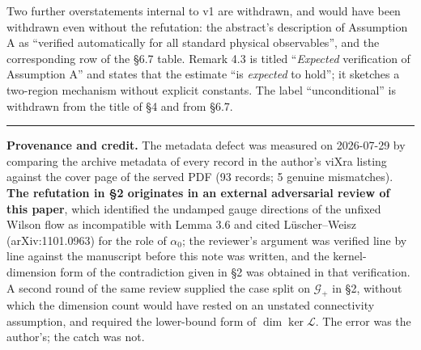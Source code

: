 \documentclass[11pt]{article}
\begin{document}
Two further overstatements internal to v1 are withdrawn, and would have been withdrawn
even without the refutation: the abstract's description of Assumption A as ``verified
automatically for all standard physical observables'', and the corresponding row of the
\S6.7 table. Remark 4.3 is titled ``\emph{Expected} verification of Assumption A'' and
states that the estimate ``is \emph{expected} to hold''; it sketches a two-region
mechanism without explicit constants. The label ``unconditional'' is withdrawn from the
title of \S4 and from \S6.7.

\vspace{4pt}
\noindent\rule{\textwidth}{0.8pt}

\noindent\footnotesize
\textbf{Provenance and credit.} The metadata defect was measured on 2026-07-29 by
comparing the archive metadata of every record in the author's viXra listing against
the cover page of the served PDF (93 records; 5 genuine mismatches). \textbf{The
refutation in \S2 originates in an external adversarial review of this paper}, which
identified the undamped gauge directions of the unfixed Wilson flow as incompatible
with Lemma 3.6 and cited L\"uscher--Weisz (arXiv:1101.0963) for the role of $\alpha_0$;
the reviewer's argument was verified line by line against the manuscript before this
note was written, and the kernel-dimension form of the contradiction given in \S2 was
obtained in that verification. A second round of the same review supplied the case
split on $\mathcal G_+$ in \S2, without which the dimension count would have rested on
an unstated connectivity assumption, and required the lower-bound form of
$\dim\ker\mathcal L$. The error was the author's; the catch was not.
\end{document}
